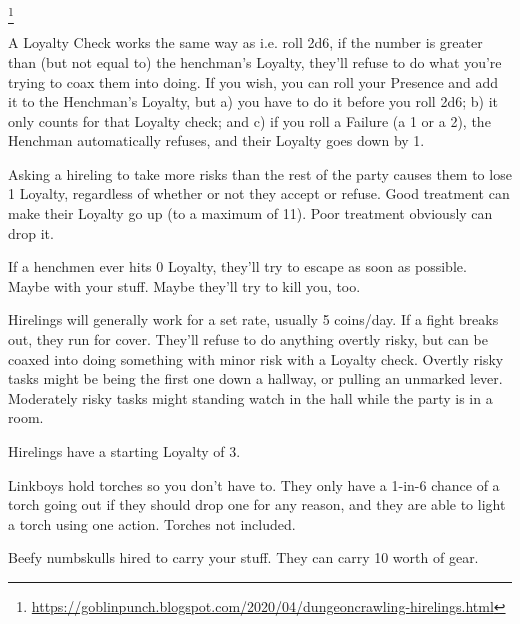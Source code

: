 {\begin{multicols}{2}

    \setcounter{footnote}{0}
    \footnote{\url{https://goblinpunch.blogspot.com/2020/04/dungeoncrawling-hirelings.html}{}}


    A Loyalty Check works the same way as  i.e. roll 2d6, if the number is greater than (but not equal to) the henchman's Loyalty, they'll refuse to do what you're trying to coax them into doing.  If you wish, you can roll your Presence \UD and add it to the Henchman's Loyalty, but a) you have to do it before you roll 2d6; b) it only counts for that Loyalty check;  and c) if you roll a Failure (a 1 or a 2), the Henchman automatically refuses, and their Loyalty goes down by 1.

    Asking a hireling to take more risks than the rest of the party causes them to lose 1 Loyalty, regardless of whether or not they accept or refuse. Good treatment can make their Loyalty go up (to a maximum of 11).  Poor treatment obviously can drop it.

    If a henchmen ever hits 0 Loyalty, they'll try to escape as soon as possible.  Maybe with your stuff.  Maybe they'll try to kill you, too.



    Hirelings will generally work for a set rate, usually 5 coins/day.  If a fight breaks out, they run for cover. They'll refuse to do anything overtly risky, but can be coaxed into doing something with minor risk with a Loyalty check.  Overtly risky tasks might be being the first one down a hallway, or pulling an unmarked lever. Moderately risky tasks might standing watch in the hall while the party is in a room.

    Hirelings have a starting Loyalty of 3.


    Linkboys hold torches so you don't have to. They only have a 1-in-6 chance of a torch going out if they should drop one for any reason, and they are able to light a torch using one action.  Torches not included.


    Beefy numbskulls hired to carry your stuff. They can carry 10  worth of gear.


\end{multicols}}
